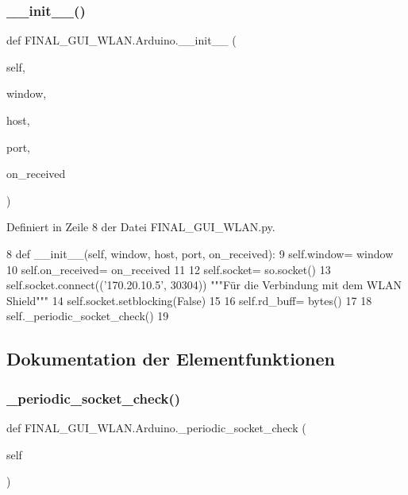 \subsubsection{\texorpdfstring{\+\_\+\+\_\+init\+\_\+\+\_\+()}{\_\_init\_\_()}}
{\footnotesize\ttfamily def F\+I\+N\+A\+L\+\_\+\+G\+U\+I\+\_\+\+W\+L\+A\+N.\+Arduino.\+\_\+\+\_\+init\+\_\+\+\_\+ (\begin{DoxyParamCaption}\item[{}]{self,  }\item[{}]{window,  }\item[{}]{host,  }\item[{}]{port,  }\item[{}]{on\+\_\+received }\end{DoxyParamCaption})}



Definiert in Zeile 8 der Datei F\+I\+N\+A\+L\+\_\+\+G\+U\+I\+\_\+\+W\+L\+A\+N.\+py.


\begin{DoxyCode}
8     \textcolor{keyword}{def }\_\_init\_\_(self, window, host, port, on\_received):
9         self.window= window
10         self.on\_received= on\_received
11 
12         self.socket= so.socket()
13         self.socket.connect((\textcolor{stringliteral}{'170.20.10.5'}, 30304))    \textcolor{stringliteral}{"""Für die Verbindung mit dem WLAN Shield"""}
14         self.socket.setblocking(\textcolor{keyword}{False})
15 
16         self.rd\_buff= bytes()
17 
18         self.\_periodic\_socket\_check()
19 
\end{DoxyCode}


\subsection{Dokumentation der Elementfunktionen}
\mbox{\label{class_f_i_n_a_l___g_u_i___w_l_a_n_1_1_arduino_a870ded4eb313dea386ae38c6c6267bbf}} 
\subsubsection{\texorpdfstring{\+\_\+periodic\+\_\+socket\+\_\+check()}{\_periodic\_socket\_check()}}
{\footnotesize\ttfamily def F\+I\+N\+A\+L\+\_\+\+G\+U\+I\+\_\+\+W\+L\+A\+N.\+Arduino.\+\_\+periodic\+\_\+socket\+\_\+check (\begin{DoxyParamCaption}\item[{}]{self }\end{DoxyParamCaption})\hspace{0.3cm}{\ttfamily [private]}}



